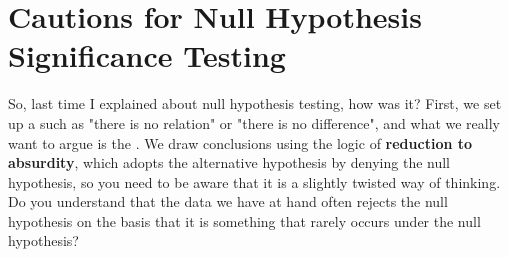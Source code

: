 \documentclass{ltjsbook}
\begin{document}
\chapter{Cautions for Null Hypothesis Significance Testing}
\label{m19_NHST2}
So, last time I explained about null hypothesis testing, how was it?
First, we set up a  such as "there is no relation" or "there is no difference", and what we really want to argue is the . We draw conclusions using the logic of \textbf{reduction to absurdity}, which adopts the alternative hypothesis by denying the null hypothesis, so you need to be aware that it is a slightly twisted way of thinking. Do you understand that the data we have at hand often rejects the null hypothesis on the basis that it is something that rarely occurs under the null hypothesis?
\end{document}
